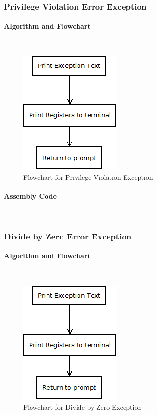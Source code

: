 \documentclass[12pt]{article}
\begin{document}
			\subsubsection{Privilege Violation Error Exception}
			\paragraph{Algorithm and Flowchart}~\\
			
			
\begin{figure}[H]
\centering
\includegraphics[width=0.3\linewidth]{Exception}
\caption{Flowchart for Privilege Violation Exception}
\label{fig:priv}
\end{figure}
			\paragraph{Assembly Code}~\\	
			
			\subsubsection{Divide by Zero Error Exception}
			\paragraph{Algorithm and Flowchart}~\\
			
			\begin{figure}[H]
				\centering
				\includegraphics[width=0.3\linewidth]{Exception}
				\caption{Flowchart for Divide by Zero Exception}
				\label{fig:zero}
			\end{figure}
\end{document}
